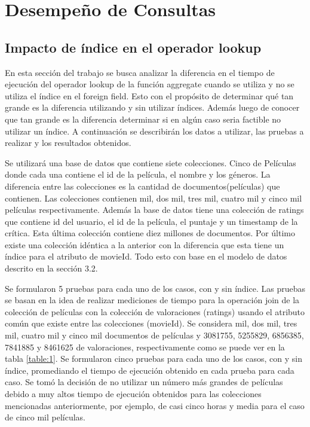 \documentclass[conference,compsoc]{sty/IEEEtran}
\begin{document}
\section{Desempeño de Consultas}
\subsection{Impacto de índice en el operador lookup}
En esta sección del trabajo se busca analizar la diferencia en el tiempo de ejecución del operador lookup de la función aggregate cuando se utiliza y no se utiliza el índice en el foreign field. Esto con el propósito de determinar qué tan grande es la diferencia utilizando y sin utilizar índices. Además luego de conocer que tan grande es la diferencia determinar si en algún caso seria factible no utilizar un índice. A continuación se describirán los datos a utilizar, las pruebas a realizar y los resultados obtenidos.

Se utilizará una base de datos que contiene siete colecciones. Cinco de Películas donde cada una contiene el id de la película, el nombre y los géneros. La diferencia entre las colecciones es la cantidad de documentos(películas) que contienen. Las colecciones contienen mil, dos mil, tres mil, cuatro mil y cinco mil películas respectivamente. Además la base de datos tiene una colección de ratings que contiene id del usuario, el id de la película, el puntaje y un timestamp de la crítica. Esta última colección contiene diez millones de documentos. Por último existe una colección idéntica a la anterior con la diferencia que esta tiene un índice para el atributo de movieId. Todo esto con base en el modelo de datos descrito en la sección 3.2.

Se formularon 5 pruebas para cada uno de los casos, con y sin índice. Las pruebas se basan en la idea de realizar mediciones de tiempo para la operación join de la colección de películas con la colección de valoraciones (ratings) usando el atributo común que existe entre las colecciones (movieId). Se considera  mil, dos mil, tres mil, cuatro mil y cinco mil documentos de películas y 3081755, 5255829, 6856385, 7841885 y 8461625 de valoraciones, respectivamente como se puede ver en la tabla \ref{table:1}. Se formularon cinco pruebas para cada uno de los casos, con y sin índice, promediando el tiempo de ejecución obtenido en cada prueba para cada caso. Se tomó la decisión de no utilizar un número más grandes de películas debido a muy altos tiempo de ejecución obtenidos para las colecciones mencionadas anteriormente, por ejemplo, de casi cinco horas y media para el caso de cinco mil películas. 
\end{document}
